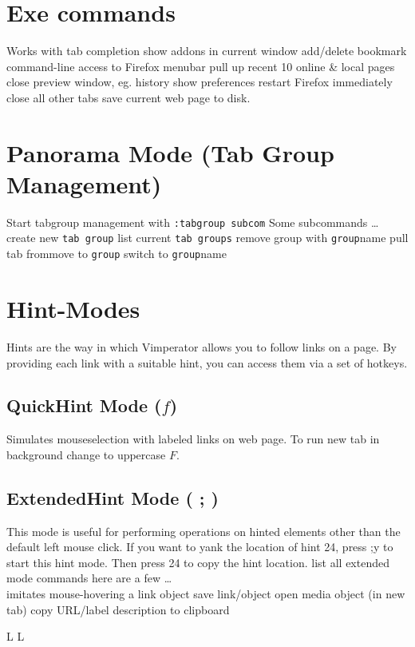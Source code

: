 \section{Exe commands}{Works with tab completion}
	{show addons in current window}
	{add/delete bookmark}
	{command-line access to Firefox menubar}
	{pull up recent 10 online \& local pages}
	{close preview window, eg. history}
	{show preferences}
	{restart Firefox immediately}
	{close all other tabs}
	{save current web page to disk.}

\section{Panorama Mode (Tab Group Management)}{Start tabgroup management with {\tt :tabgroup subcom}}
Some subcommands \ldots \\
	{create new {\tt tab group}}
	{list current {\tt tab groups}}
	{remove group with {\tt group}name}
	{pull tab from\or move to {\tt group}}
	{switch to {\tt group}name}




\section{Hint-Modes}{Hints are the way in which Vimperator allows you to follow links on a page. By
providing each link with a suitable hint, you can access them via a set of hotkeys. }
\subsection{QuickHint Mode ($f$)}{Simulates mouseselection with labeled
links on web page. To run new tab in background change to uppercase $F$.}
\subsection{ExtendedHint Mode ( ; )}{This mode is useful for
performing operations on hinted elements other than the default
left mouse click. If you want to yank the location of hint 24, press ;y to start this hint
mode. Then press 24 to copy the hint location.}
	{list all extended mode commands}
here are a few \ldots\\
\cmdS{;~}	{imitates mouse-hovering a link object}
	{save link/object}
	{open media object (in new tab)}
	{copy URL/label description to clipboard}

\copyrightnotice
%


\vfil
\supereject
\if L\lr \else\null\vfill\eject\fi
\if L\lr \else\null\vfill\eject\fi
\bye

